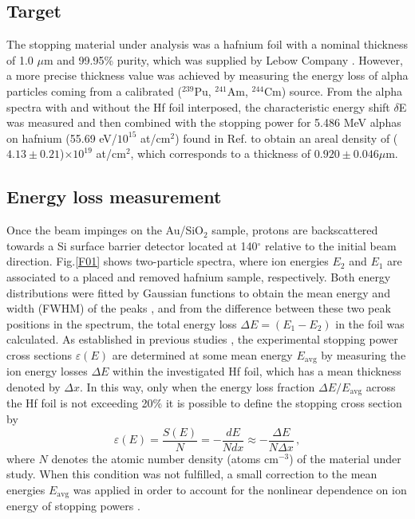 \documentclass[aps,prb,reprint,groupedaddress]{revtex4-1}
\begin{document}
\subsection{Target}
The stopping material under analysis was a hafnium foil with a nominal thickness of 1.0 $\mu$m and 99.95\% purity, which was supplied by Lebow Company \cite{Lebow}. However, a more precise thickness value was achieved by measuring the energy loss of alpha particles coming from a calibrated ($^{239}$Pu, $^{241}$Am, $^{244}$Cm) source. From the alpha spectra with and without the Hf foil interposed, the characteristic energy shift $\delta$E was measured and then combined with the stopping power for 5.486 MeV alphas on hafnium (55.69 eV/$10^{15}$ at/cm$^2$) found in Ref.\cite{Ziegler01} to obtain an areal density of ($4.13\pm0.21$)$\times 10^{19}$ at/cm$^2$, which corresponds to a thickness of $0.920\pm0.046 \mu$m.

\subsection{Energy loss measurement}
Once the beam impinges on the Au/SiO$_2$ sample, protons are backscattered towards a Si surface barrier detector located at 140$^{\circ}$ relative to the initial beam direction. Fig.\ref{F01} shows two-particle spectra, where ion energies $E_2$ and $E_1$ are associated to a placed and removed hafnium sample, respectively. Both energy distributions were fitted by Gaussian functions to obtain the mean energy and width (FWHM) of the peaks \cite{Sun01}, and from the difference between these two peak positions in the spectrum, the total energy loss $\Delta E = (E_1 - E_2)$ in the foil was calculated. As established in previous studies \cite{Miranda01, Damache02}, the experimental stopping power cross sections $\varepsilon (E) $ are determined at some mean energy $E_{\mathrm{avg}}$ by measuring the ion energy losses $\Delta E$ within the investigated Hf foil, which has a mean thickness denoted by $\Delta x$. In this way, only when the energy loss fraction $\Delta E/E_{\mathrm{avg}}$ across the Hf foil is not exceeding 20\% it is possible to define the stopping cross section by \cite{Raisanen01,Schulz01}
\begin{equation}\label{eq:stcross}
 \varepsilon (E) = \frac{S(E)}{N} = -\frac{dE}{N dx} \approx -\frac{\Delta E}{N \Delta x}\,,
\end{equation}
where $N$ denotes the atomic number density (atoms cm$^{-3}$) of the material under study. When this condition was not fulfilled, a small correction to the mean energies $E_{\mathrm{avg}}$ was applied in order to account for the nonlinear dependence on ion energy of stopping powers \cite{Chilton,Rajatora}.
\end{document}
